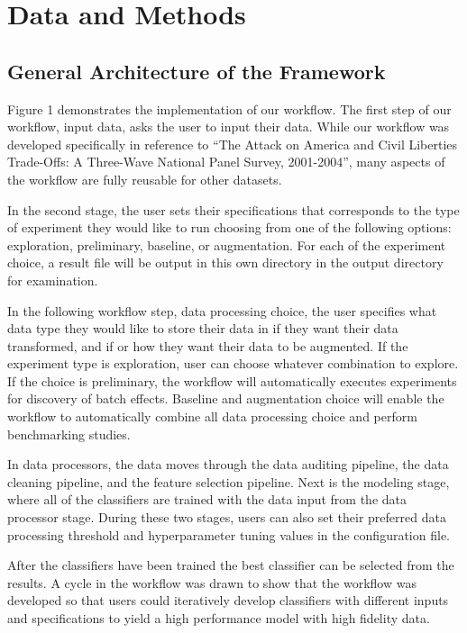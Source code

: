 \section{Data and Methods}\label{sec:data\_and\_methods}

\subsection{General Architecture of the Framework}
Figure 1 demonstrates the implementation of our workflow. The first step of our workflow, input data, asks the user to input their data. While our workflow was developed specifically in reference to “The Attack on America and Civil Liberties Trade-Offs: A Three-Wave National Panel Survey, 2001-2004”, many aspects of the workflow are fully reusable for other datasets. 

In the second stage, the user sets their specifications that corresponds to the type of experiment they would like to run choosing from one of the following options: exploration, preliminary, baseline, or augmentation. For each of the experiment choice, a result file will be output in this own directory in the output directory for examination. 

In the following workflow step, data processing choice, the user specifies what data type they would like to store their data in if they want their data transformed, and if or how they want their data to be augmented. If the experiment type is exploration, user can choose whatever combination to explore. If the choice is preliminary, the workflow will automatically executes experiments for discovery of batch effects. Baseline and augmentation choice will enable the workflow to automatically combine all data processing choice and perform benchmarking studies. 

In data processors, the data moves through the data auditing pipeline, the data cleaning pipeline, and the feature selection pipeline. Next is the modeling stage, where all of the classifiers are trained with the data input from the data processor stage. During these two stages, users can also set their preferred data processing threshold and hyperparameter tuning values in the configuration file. 

After the classifiers have been trained the best classifier can be selected from the results. A cycle in the workflow was drawn to show that the workflow was developed so that users could iteratively develop classifiers with different inputs and specifications to yield a high performance model with high fidelity data. 

